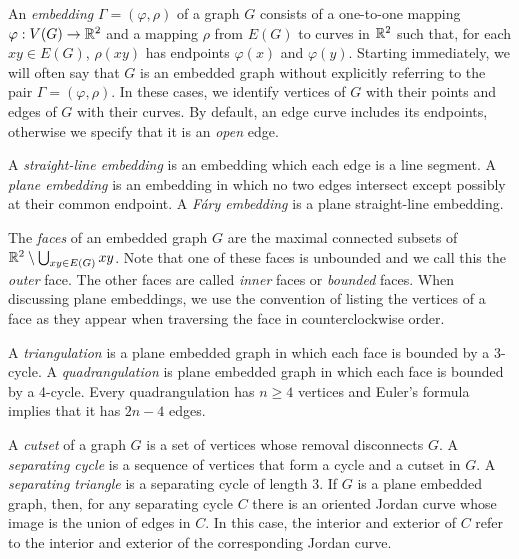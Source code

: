 \documentclass{patmorin}
\begin{document}
An \emph{embedding} $\Gamma=(\varphi,\rho)$ of a graph $G$ consists
of a one-to-one mapping $\varphi:V(G)\to\mathbb{R}^2$ and a mapping $\rho$ from
$E(G)$ to curves in $\mathbb{R}^2$ such that, for each $xy\in E(G)$, $\rho(xy)$
has endpoints $\varphi(x)$ and $\varphi(y)$.
Starting immediately,  we will often say that $G$ is an embedded graph
without explicitly referring to the pair $\Gamma=(\varphi,\rho)$.
In these cases, we identify vertices of $G$ with their
points and edges of $G$ with their curves. By default, an edge curve includes
its endpoints, otherwise we specify that it is an \emph{open} edge.

A \emph{straight-line embedding} is
an embedding which each edge is a line segment.  A \emph{plane embedding}
is an embedding in which no two edges intersect except possibly at their
common endpoint.  A \emph{Fáry embedding} is a plane straight-line
embedding.

The \emph{faces} of an embedded graph $G$ are the maximal connected
subsets of $\mathbb{R}^2\setminus\bigcup_{xy\in E(G)} xy$.  Note that one of
these faces is unbounded and we call this the \emph{outer} face. The
other faces are called \emph{inner} faces or \emph{bounded} faces.
When discussing plane embeddings, we use the convention of listing
the vertices of a face as they appear when traversing the face in
counterclockwise order.

A \emph{triangulation} is a plane embedded graph in which each face is
bounded by a 3-cycle.  A \emph{quadrangulation} is plane embedded graph
in which each face is bounded by a 4-cycle. Every quadrangulation has
$n\ge 4$ vertices and Euler's formula implies that it has $2n-4$ edges.

A \emph{cutset} of a graph $G$ is a set of vertices whose removal
disconnects $G$.  A \emph{separating cycle} is a sequence of vertices
that form a cycle and a cutset in $G$.  A \emph{separating triangle} is
a separating cycle of length 3.  If $G$ is a plane embedded graph, then,
for any separating cycle $C$ there is an oriented Jordan curve whose image
is the union of edges in $C$.  In this case, the interior and exterior of
$C$ refer to the interior and exterior of the corresponding Jordan curve.
\end{document}
